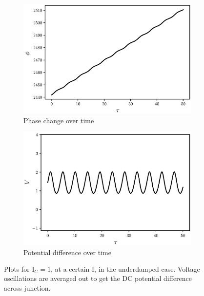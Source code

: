 \documentclass{thesis}
\begin{document}
\begin{figure}[H]
    \centering
    \begin{subfigure}[b]{0.48\textwidth}
        \centering
        \includegraphics[width=\textwidth]{images/tauphi.eps}
        \caption{Phase change over time}
    \end{subfigure}
    \hfill
    \begin{subfigure}[b]{0.48\textwidth}
        \centering
        \includegraphics[width=\textwidth]{images/tauV.eps}
        \caption{Potential difference over time}
    \end{subfigure}
    \caption{Plots for I$_C = 1$, at a certain I, in the underdamped case. Voltage oscillations are averaged out to get the DC potential difference across junction.}
    \label{tauvphi}
\end{figure}
\end{document}
